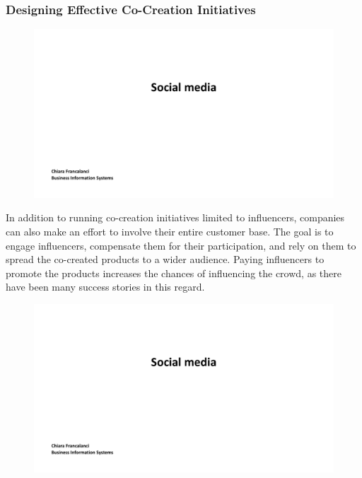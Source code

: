 \subsubsection{Designing Effective Co-Creation
    Initiatives}\label{designing-effective-co-creation-initiatives}

\begin{figure}[!h]
    \centering
    \includegraphics[page=15, trim = 1.5cm 6cm 3cm 4cm, clip, width=\textwidth]{images/04 - Social_Media.pdf}
\end{figure}

In addition to running co-creation initiatives limited to influencers,
companies can also make an effort to involve their entire customer base.
The goal is to engage influencers, compensate them for their
participation, and rely on them to spread the co-created products to a
wider audience. Paying influencers to promote the products increases the
chances of influencing the crowd, as there have been many success
stories in this regard.

\begin{figure}[!h]
    \centering
    \includegraphics[page=16, trim = 0cm 5cm 3cm 5cm, clip, width=\textwidth]{images/04 - Social_Media.pdf}
\end{figure}


